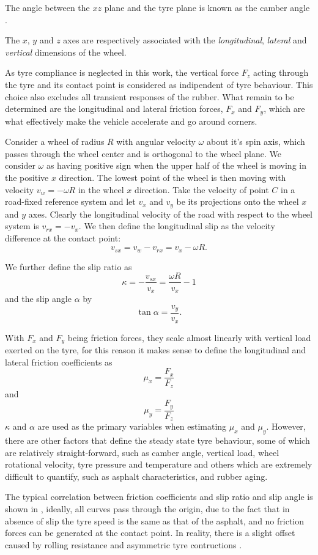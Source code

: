 The angle between the $xz$ plane and the tyre plane is known as the camber angle .

The $x$, $y$ and $z$ axes are respectively associated with the \textit{longitudinal}, \textit{lateral} and \textit{vertical} dimensions of the wheel.

As tyre compliance is neglected in this work, the vertical force $F_z$ acting through the tyre and its contact point is considered as indipendent of tyre behaviour. This choice also excludes all transient responses of the rubber. What remain to be determined are the longitudinal and lateral friction forces, $F_x$ and $F_y$, which are what effectively make the vehicle accelerate and go around corners.

Consider a wheel  of radius $R$ with angular velocity $\omega$ about it's spin axis, which passes through the wheel center and is orthogonal to the wheel plane.
We consider $\omega$ as having positive sign when the upper half of the wheel is moving in the positive $x$ direction. The lowest point of the wheel is then moving with velocity $v_{w} = -\omega R$ in the wheel $x$ direction.
Take the velocity of point $C$ in a road-fixed reference system and let $v_x$ and $v_y$ be its projections onto the wheel $x$ and $y$ axes.
Clearly the longitudinal velocity of the road with respect to the wheel system is $v_{rx} = - v_x$.
We then define the longitudinal slip as the velocity difference at the contact point:
$$v_{sx} = v_{w} - v_{rx} = v_x - \omega R .$$

We further define the slip ratio as
$$ \kappa = - \frac{v_{sx}}{v_{x}} = \frac{\omega R}{v_x}-1$$
and the slip angle $\alpha$ by
$$\tan{\alpha} = \frac{v_y}{v_x}.$$

With $F_x$ and $F_y$ being friction forces, they scale almost linearly with vertical load exerted on the tyre, for this reason it makes sense to define the longitudinal and lateral friction coefficients as
$$ \mu_x = \frac{F_x}{F_z}$$
and
$$ \mu_y = \frac{F_y}{F_z}$$
$\kappa$ and $\alpha$ are used as the primary variables when estimating $\mu_x$ and $\mu_y$. However, there are other factors that define the steady state tyre behaviour, some of which are relatively straight-forward, such as camber angle, vertical load, wheel rotational velocity, tyre pressure and temperature and others which are extremely difficult to quantify, such as asphalt characteristics, and rubber aging.

The typical correlation between friction coefficients and slip ratio and slip angle is shown in
, ideally, all curves pass through the origin, due to the fact that in absence of slip the tyre speed is the same as that of the asphalt, and no friction forces can be generated at the contact point. In reality, there is a slight offset caused by rolling resistance and asymmetric tyre contructions .

